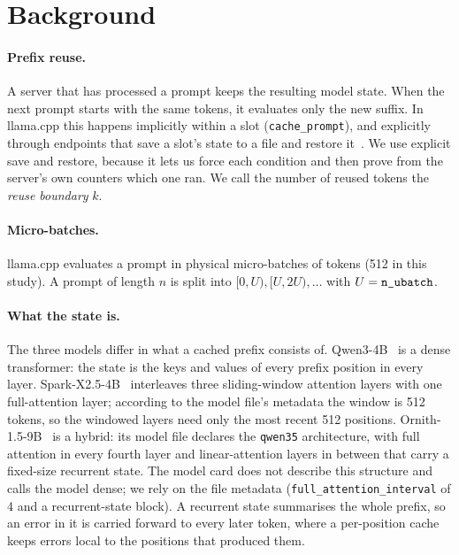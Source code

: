 \section{Background}
\label{sec:background}

\paragraph{Prefix reuse.}
A server that has processed a prompt keeps the resulting model state. When the
next prompt starts with the same tokens, it evaluates only the new suffix. In
llama.cpp this happens implicitly within a slot (\texttt{cache\_prompt}), and
explicitly through endpoints that save a slot's state to a file and restore
it~\cite{llamacpp-server}. We use explicit save and restore, because it lets us
force each condition and then prove from the server's own counters which one
ran. We call the number of reused tokens the \emph{reuse boundary} $k$.

\paragraph{Micro-batches.}
llama.cpp evaluates a prompt in physical micro-batches of \nub{} tokens
(512 in this study). A prompt of length $n$ is split into
$[0,U), [U,2U), \dots$ with $U = \texttt{n\_ubatch}$.

\paragraph{What the state is.}
The three models differ in what a cached prefix consists of.
Qwen3-4B~\cite{qwen3} is a dense transformer: the state is the keys and values
of every prefix position in every layer.
Spark-X2.5-4B~\cite{spark} interleaves three sliding-window attention layers
with one full-attention layer; according to the model file's metadata the
window is 512 tokens, so the windowed layers need only the most recent 512
positions.
Ornith-1.5-9B~\cite{ornith} is a hybrid: its model file declares the
\texttt{qwen35} architecture, with full attention in every fourth layer and
linear-attention layers in between that carry a fixed-size recurrent state.
The model card does not describe this structure and calls the model dense; we
rely on the file metadata (\texttt{full\_attention\_interval} of 4 and a
recurrent-state block). A
recurrent state summarises the whole prefix, so an error in it is carried
forward to every later token, where a per-position cache keeps errors local to
the positions that produced them.
